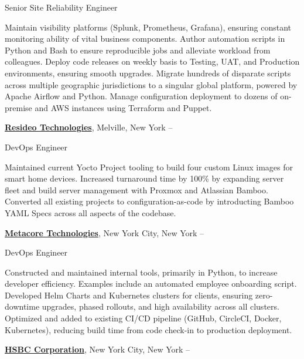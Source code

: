 \documentclass[letterpaper,MMMyyyy,nonstopmode]{simpleresumecv}
\begin{document}
\begin{Body}
\Gap
\BulletItem
Senior Site Reliability Engineer
\begin{Detail}
\SubBulletItem
Maintain visibility platforms (Splunk, Prometheus, Grafana), ensuring constant monitoring ability of vital business components.
\SubBulletItem
Author automation scripts in Python and Bash to ensure reproducible jobs and alleviate workload from colleagues. 
\SubBulletItem
Deploy code releases on weekly basis to Testing, UAT, and Production environments, ensuring smooth upgrades.
\SubBulletItem
Migrate hundreds of disparate scripts across multiple geographic jurisdictions to a singular global platform, powered by Apache Airflow and Python.
\SubBulletItem
Manage configuration deployment to dozens of on-premise and AWS instances using Terraform and Puppet.
\end{Detail}

\BigGap
\Entry
\href{https://resideo.com/}
{\textbf{Resideo Technologies}},
Melville, New York
\hfill
{} --

\Gap
\BulletItem
DevOps Engineer
\begin{Detail}
\SubBulletItem
Maintained current Yocto Project tooling to build four custom Linux images for smart home devices.
\SubBulletItem
Increased turnaround time by 100\% by expanding server fleet and build server management with Proxmox and Atlassian Bamboo.
\SubBulletItem
Converted all existing projects to configuration-as-code by introducting Bamboo YAML Specs across all aspects of the codebase.
\end{Detail}

\BigGap
\Entry
\href{https://metacore.tech/}
{\textbf{Metacore Technologies}},
New York City, New York
\hfill
{} --

\Gap
\BulletItem
DevOps Engineer
\begin{Detail}
\SubBulletItem
Constructed and maintained internal tools, primarily in Python, to increase developer efficiency. Examples include an automated employee onboarding script.
\SubBulletItem
Developed Helm Charts and Kubernetes clusters for clients, ensuring zero-downtime upgrades, phased rollouts, and high availability across all clusters.
\SubBulletItem
Optimized and added to existing CI/CD pipeline (GitHub, CircleCI, Docker, Kubernetes), reducing build time from code check-in to production deployment.
\end{Detail}

\BigGap
\Entry
\href{https://www.hsbc.com/}
{\textbf{HSBC Corporation}},
New York City, New York
\hfill
{} --


\end{Body}
\end{document}
